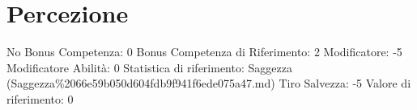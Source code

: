 \section{Percezione}\label{percezione}

\begin{description}
\tightlist
\item[Tags: ABI]
No Bonus Competenza: 0 Bonus Competenza di Riferimento: 2 Modificatore:
-5 Modificatore Abilità: 0 Statistica di riferimento: Saggezza
(Saggezza\%2066e59b050d604fdb9f941f6ede075a47.md) Tiro Salvezza: -5
Valore di riferimento: 0
\end{description}
